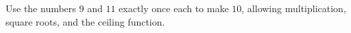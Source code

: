 Use the numbers $9$ and $11$ exactly once each to make $10$, allowing multiplication, square roots, and the ceiling function.
